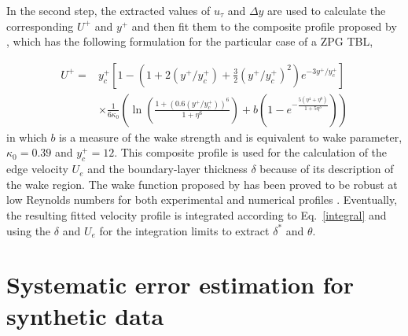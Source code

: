 In the second step, the extracted values of $u_\tau$ and $\Delta y$ are used to calculate the corresponding $U^+$ and $y^+$ and then fit them to the composite profile proposed by \citet{Nickels:2004p15662}, which has the following formulation for the particular case of a {ZPG TBL}, 

\begin{equation}
\label{Nickels}
\begin{array}{lll}
U^+ = & y^+_c \left[1- (1+2(y^+/y_c^+)+\frac{3}{2}(y^+/y^+_c)^2)e^{-3y^+/y_c^+}  \right] \\
& \times \frac{1}{6\kappa
_0} \left(\ln(\frac{1+(0.6(y^+/y_c^+))^6}{1+\eta^6})+b(1-e^{-\frac{5(\eta^4+\eta^8)}{1+5\eta^3}})\right) 
\end{array}
\end{equation} 
in which $b$ is a measure of the wake strength and is equivalent to wake parameter, $\kappa_0=0.39$ and $y_c^+=12$. 
This composite profile is used for the calculation of the edge velocity $U_e$ and the boundary-layer thickness $\delta$ because of its description of the wake region. The wake function proposed by \citet{Nickels:2004p15662} has been proved to be robust at low Reynolds numbers for both experimental and numerical profiles \citep{Schlatter:2010p35519}. Eventually, the resulting fitted velocity profile is integrated according to Eq.~\ref{integral} and using the $\delta$ and $U_e$ for the integration limits to extract $\delta^*$ and $\theta$. 

\section{Systematic error estimation for synthetic data}
\label{s:SyntheticValidation}

